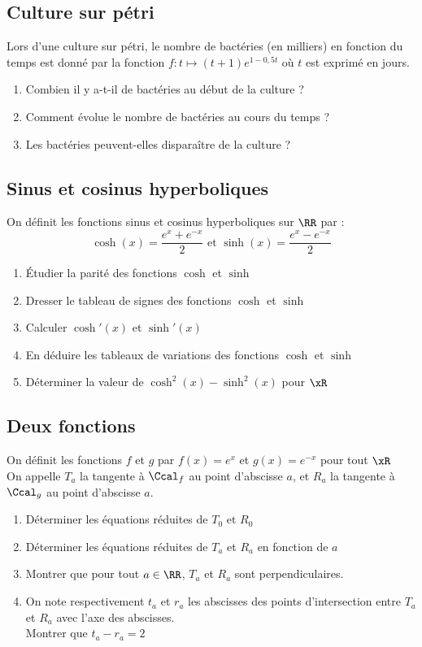 \documentclass[oneside,12pt]{book}          %
\begin{document}
\subsection{Culture sur pétri}
Lors d'une culture sur pétri, le nombre de bactéries (en milliers) en fonction du temps est donné par la fonction $f:t\mapsto(t+1)e^{1-0,5t}$ où $t$ est exprimé en jours.
\begin{enumerate}
    \item Combien il y a-t-il de bactéries au début de la culture ?
    \item Comment évolue le nombre de bactéries au cours du temps ?
    \item Les bactéries peuvent-elles disparaître de la culture ?
\end{enumerate}



\subsection{Sinus et cosinus hyperboliques}
On définit les fonctions sinus et cosinus hyperboliques sur $\RR$ par :
\[\cosh(x)=\frac{e^x+e^{-x}}{2} \text{  et  } \sinh(x)=\frac{e^x-e^{-x}}{2}\]
\begin{enumerate}
    \item Étudier la parité des fonctions $\cosh$ et $\sinh$
    \item Dresser le tableau de signes des fonctions $\cosh$ et $\sinh$
    \item Calculer $\cosh'(x)$ et $\sinh'(x)$
    \item En déduire les tableaux de variations des fonctions $\cosh$ et $\sinh$
    \item Déterminer la valeur de $\cosh^2(x)-\sinh^2(x)$ pour $\xR$
\end{enumerate}



\subsection{Deux fonctions}
On définit les fonctions $f$ et $g$ par $f(x)=e^x$ et $g(x)=e^{-x}$ pour tout $\xR$\\
On appelle $T_a$ la tangente à $\Ccal_f$ au point d'abscisse $a$, et $R_a$ la tangente à $\Ccal_g$ au point d'abscisse $a$.
\begin{enumerate}
    \item Déterminer les équations réduites de $T_0$ et $R_0$
    \item Déterminer les équations réduites de $T_a$ et $R_a$ en fonction de $a$
    \item Montrer que pour tout $a\in\RR$, $T_a$ et $R_a$ sont perpendiculaires.
    \item On note respectivement $t_a$ et $r_a$ les abscisses des points d'intersection entre $T_a$ et $R_a$ avec l'axe des abscisses.\\
    Montrer que $t_a-r_a=2$
\end{enumerate}
\end{document}
